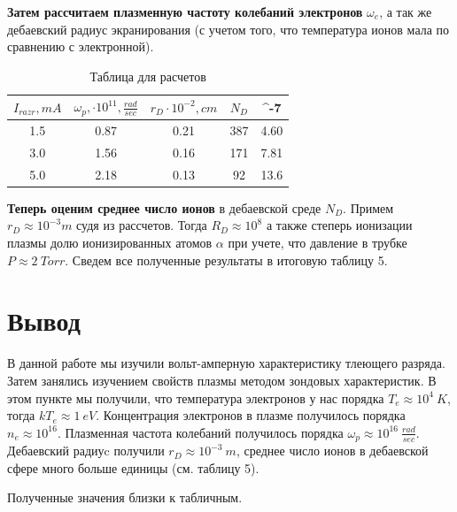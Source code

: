\documentclass[a4paper, 14pt]{extarticle}%
\begin{document}
\textbf{Затем рассчитаем плазменную частоту колебаний электронов} $\omega_e$, а так же дебаевский радиус экранирования (с учетом того, что температура ионов мала по сравнению с электронной). 

\begin{table}[!]
  \caption{Таблица для расчетов}
  \begin{center}
  	\begin{tabular}{|c|c|c|c|c|}
  	    \hline
  	$I_{razr}, mA$ & $\omega_p, \cdot 10^{11}, \frac{rad}{sec}$ & $r_D \cdot 10^{-2}, cm$ & $N_D $ & \alpha \cdot 10^{-7} \\
  	    \hline
  	1.5 & 0.87 & 0.21 &  387 &  4.60  \\
  		\hline
    3.0 & 1.56 & 0.16  & 171 &  7.81  \\
  		\hline
  	5.0 & 2.18 & 0.13  & 92 & 13.6  \\
  		\hline
  	\end{tabular}
  \end{center}
\label{B_table}
\end{table}



\textbf{Теперь оценим среднее число ионов} в дебаевской среде $N_D$. 
Примем $r_D \approx 10^{-3} m$ судя из рассчетов. Тогда $R_D \approx 10^{8}$
а также степерь ионизации плазмы долю ионизированных атомов $\alpha$ при учете, что давление в трубке $P \approx  2 \: Torr$.
Сведем все полученные результаты в итоговую таблицу 5.


\section{Вывод}

В данной работе мы изучили вольт-амперную характеристику тлеющего разряда.
Затем занялись изучением свойств плазмы методом зондовых характеристик.
\newline
В этом пункте мы получили, что температура электронов у нас порядка $T_e \approx 10^{4} \: K$, тогда $kT_e \approx 1 \: eV$. 
\newline
Концентрация электронов в плазме получилось порядка $n_e \approx 10^{16}$. 
\newline
Плазменная частота колебаний получилось порядка $\omega_p \approx 10^{16} \: \frac{rad}{sec}$.
\newline
Дебаевский радиуc получили $r_D \approx 10^{-3} \: m$, среднее число ионов в дебаевской сфере много больше единицы (см. таблицу 5). 

Полученные значения близки к табличным. 
\end{document}
